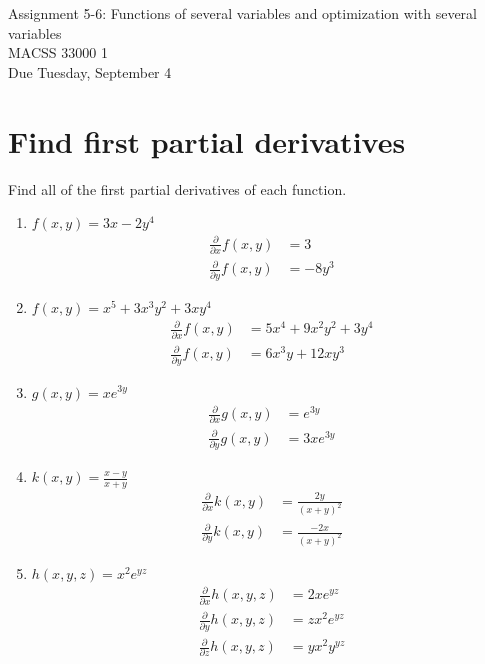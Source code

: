\documentclass[12pt]{article}
\begin{document}
	\begin{center}
		Assignment 5-6: Functions of several variables and optimization with several variables\\
        MACSS 33000 1 \\
		Due Tuesday, September 4 \\
	\end{center}



\section{Find first partial derivatives}
Find all of the first partial derivatives of each function.

\begin{enumerate}
    \item $f(x,y) = 3x -2y^4 $
        \begin{align*}
            \frac{\partial}{\partial x}f(x,y) &=3
            \\ \frac{\partial }{\partial y}f(x,y) &= -8y^3
        \end{align*}
    \item $f(x,y) = x^5 + 3x^3y^2 + 3xy^4$
        \begin{align*}
        \frac{\partial}{\partial x}f(x,y) &=5x^4 + 9x^2y^2+3y^4
        \\ \frac{\partial }{\partial y}f(x,y) &= 6x^3y+12xy^3
        \end{align*}
    \item $g(x,y) = xe^{3y}$
        \begin{align*}
            \frac{\partial}{\partial x}g(x,y) &=e^{3y}
        \\ \frac{\partial }{\partial y}g(x,y) &=3xe^{3y} 
        \end{align*}
    \item $k(x,y) = \frac{x-y}{x+y}$
    \begin{align*}
        \frac{\partial }{\partial x}k(x,y) &= \frac{2y}{(x+y)^2}
        \\ \frac{\partial }{\partial y}k(x,y) &= \frac{-2x }{(x+y)^2}
    \end{align*}
    \item $h(x,y,z)= x^2e^{yz}$
        \begin{align*}
            \frac{\partial }{\partial x}h(x,y,z) &= 2xe^{yz}
            \\ \frac{\partial }{\partial y}h(x,y,z) &= zx^2 e^{yz}
            \\ \frac{\partial }{\partial z}h(x,y,z) &= yx^2 y^{yz}
        \end{align*}
\end{enumerate}
\end{document}

